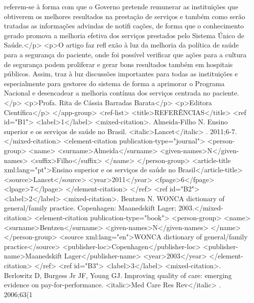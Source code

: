         referem-se à forma com que o Governo pretende remunerar as instituições que obtiverem os
        melhores resultados na prestação de serviços e também como serão tratadas as informações
        advindas de notifi cações, de forma que o conhecimento gerado promova a melhoria efetiva dos
        serviços prestados pelo Sistema Único de Saúde.</p>
      <p>O artigo faz refl exão à luz da melhoria da política de saúde para a segurança do paciente,
        onde foi possível verificar que ações para a cultura de segurança podem proliferar e gerar
        bons resultados também em hospitais públicos. Assim, traz à luz discussões importantes para
        todas as instituições e especialmente para gestores do sistema de forma a aprimorar o
        Programa Nacional e desencadear a melhoria contínua dos serviços centrada no paciente.</p>
      <p>Profa. Rita de Cássia Barradas Barata</p>
      <p>Editora Científica</p>
    </app-group>
    <ref-list>
      <title>REFERÊNCIAS</title>
      <ref id="B1">
        <label>1</label>
        <mixed-citation>. Almeida-Filho N. Ensino superior e os serviços de saúde no Brasil.
            <italic>Lancet</italic> . 2011;6-7.</mixed-citation>
        <element-citation publication-type="journal">
          <person-group>
            <name>
              <surname>Almeida</surname>
              <given-names>N</given-names>
              <suffix>Filho</suffix>
            </name>
          </person-group>
          <article-title xml:lang="pt">Ensino superior e os serviços de saúde no
            Brasil</article-title>
          <source>Lancet</source>
          <year>2011</year>
          <fpage>6</fpage>
          <lpage>7</lpage>
        </element-citation>
      </ref>
      <ref id="B2">
        <label>2</label>
        <mixed-citation>. Bentzen N. WONCA dictionary of general/family practice. Copenhagen:
          Maanedskift Lager; 2003.</mixed-citation>
        <element-citation publication-type="book">
          <person-group>
            <name>
              <surname>Bentzen</surname>
              <given-names>N</given-names>
            </name>
          </person-group>
          <source xml:lang="en">WONCA dictionary of general/family practice</source>
          <publisher-loc>Copenhagen</publisher-loc>
          <publisher-name>Maanedskift Lager</publisher-name>
          <year>2003</year>
        </element-citation>
      </ref>
      <ref id="B3">
        <label>3</label>
        <mixed-citation>. Berlowitz D, Burgess Jr JF, Young GJ. Improving quality of care: emerging
          evidence on pay-for-performance. <italic>Med Care Res Rev</italic> . 2006;63(1
